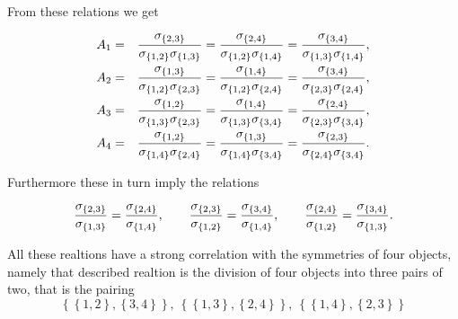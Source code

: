 \documentclass[11pt]{article}
\begin{document}
From these relations we get

\begin{eqnarray*}
A_{1} &=&\frac{\sigma _{\left\{ 2,3\right\} }}{\sigma _{\left\{ 1,2\right\}
}\sigma _{\left\{ 1,3\right\} }}=\frac{\sigma _{\left\{ 2,4\right\} }}{%
\sigma _{\left\{ 1,2\right\} }\sigma _{\left\{ 1,4\right\} }}=\frac{\sigma
_{\left\{ 3,4\right\} }}{\sigma _{\left\{ 1,3\right\} }\sigma _{\left\{
1,4\right\} }}, \\
A_{2} &=&\frac{\sigma _{\left\{ 1,3\right\} }}{\sigma _{\left\{ 1,2\right\}
}\sigma _{\left\{ 2,3\right\} }}=\frac{\sigma _{\left\{ 1,4\right\} }}{%
\sigma _{\left\{ 1,2\right\} }\sigma _{\left\{ 2,4\right\} }}=\frac{\sigma
_{\left\{ 3,4\right\} }}{\sigma _{\left\{ 2,3\right\} }\sigma _{\left\{
2,4\right\} }}, \\
A_{3} &=&\frac{\sigma _{\left\{ 1,2\right\} }}{\sigma _{\left\{ 1,3\right\}
}\sigma _{\left\{ 2,3\right\} }}=\frac{\sigma _{\left\{ 1,4\right\} }}{%
\sigma _{\left\{ 1,3\right\} }\sigma _{\left\{ 3,4\right\} }}=\frac{\sigma
_{\left\{ 2,4\right\} }}{\sigma _{\left\{ 2,3\right\} }\sigma _{\left\{
3,4\right\} }}, \\
A_{4} &=&\frac{\sigma _{\left\{ 1,2\right\} }}{\sigma _{\left\{ 1,4\right\}
}\sigma _{\left\{ 2,4\right\} }}=\frac{\sigma _{\left\{ 1,3\right\} }}{%
\sigma _{\left\{ 1,4\right\} }\sigma _{\left\{ 3,4\right\} }}=\frac{\sigma
_{\left\{ 2,3\right\} }}{\sigma _{\left\{ 2,4\right\} }\sigma _{\left\{
3,4\right\} }}.
\end{eqnarray*}

Furthermore these in turn imply the relations

\begin{equation*}
\frac{\sigma _{\left\{ 2,3\right\} }}{\sigma _{\left\{ 1,3\right\} }}=\frac{%
\sigma _{\left\{ 2,4\right\} }}{\sigma _{\left\{ 1,4\right\} }},\qquad \frac{%
\sigma _{\left\{ 2,3\right\} }}{\sigma _{\left\{ 1,2\right\} }}=\frac{\sigma
_{\left\{ 3,4\right\} }}{\sigma _{\left\{ 1,4\right\} }},\qquad \frac{\sigma
_{\left\{ 2,4\right\} }}{\sigma _{\left\{ 1,2\right\} }}=\frac{\sigma
_{\left\{ 3,4\right\} }}{\sigma _{\left\{ 1,3\right\} }}.
\end{equation*}

All these realtions have a strong correlation with the symmetries of four
objects, namely that described realtion is the division of four objects into
three pairs of two, that is the pairing%
\begin{equation*}
\left\{ \left\{ 1,2\right\} ,\left\{ 3,4\right\} \right\} ,~\left\{ \left\{
1,3\right\} ,\left\{ 2,4\right\} \right\} ,~\left\{ \left\{ 1,4\right\}
,\left\{ 2,3\right\} \right\}
\end{equation*}
\end{document}
